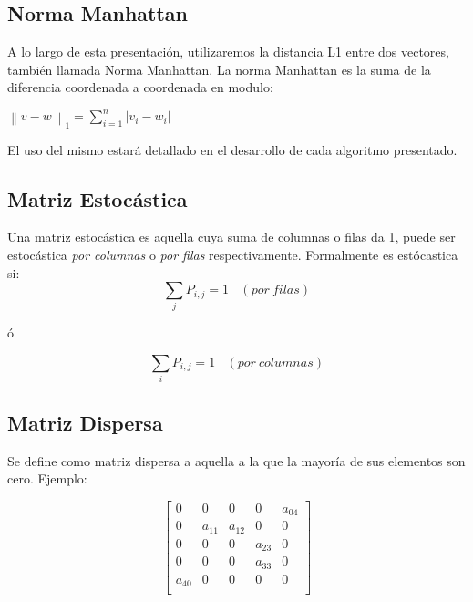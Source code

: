 \subsection{Norma Manhattan}

A lo largo de esta presentación, utilizaremos la distancia L1 entre dos vectores, también llamada Norma Manhattan.
La norma Manhattan es la suma de la diferencia coordenada a coordenada en modulo:

\begin{center}
$\left \| v - w \right \|_{1} = \sum_{i=1}^{n} \left | v_{i} - w_{i} \right |$
\end{center}

El uso del mismo estará detallado en el desarrollo de cada algoritmo presentado.

\subsection{Matriz Estocástica}
	Una matriz estocástica es aquella cuya suma de columnas o filas da 1, puede ser estocástica \textit{por columnas} o \textit{por filas} respectivamente.
	Formalmente es estócastica si:
	\begin{equation}
	\sum_j P_{i,j}=1 \ \ \ \ (por\ filas)
	\end{equation}
	\begin{center}ó\end{center}
		\begin{equation}
	 \sum_i P_{i,j}=1 \ \ \ \ (por\ columnas)
	\end{equation}
	

\subsection{Matriz Dispersa}
   Se define como matriz dispersa a aquella a la que la mayoría de sus elementos son cero.
   Ejemplo:

   $$ 
\begin{bmatrix}
       0    &      0    &   0       &   0           &   a_{04}    \\
       0    &   a_{11}  &   a_{12}  &   0           &   0    \\
       0    &      0    &   0       &   a_{23}      &   0    \\
       0    &      0    &   0       &   a_{33}      &   0    \\
  a_{40}    &      0    &   0       &   0           &   0    \\
\end{bmatrix} 
$$


